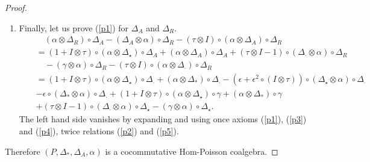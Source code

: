 \documentclass{article}
\theoremstyle{definition}
\theoremstyle{remark}
\numberwithin{equation}{section}
\begin{document}
\begin{proof}
\begin{enumerate}
\item
Finally, let us prove (\ref{p1}) for $\Delta_A$ and $\Delta_R$.
\begin{eqnarray}
 &&\quad(\alpha\otimes\Delta_R)\circ\Delta_A-(\Delta_A\otimes\alpha)\circ\Delta_R-(\tau\otimes I)\circ(\alpha\otimes\Delta_A)\circ\Delta_R\nonumber\\
&&=(1+I\otimes\tau)\circ(\alpha\otimes\Delta_\star)\circ\Delta_A+(\alpha\otimes\Delta_A)\circ\Delta_A+(\tau\otimes I-1)\circ(\Delta_\cdot\otimes\alpha)\circ\Delta_R\nonumber\\
&&\quad-(\gamma\otimes\alpha)\circ\Delta_R-(\tau\otimes I)\circ(\alpha\otimes\Delta_\cdot)\circ\Delta_R\nonumber\\
&&=(1+I\otimes\tau)\circ(\alpha\otimes\Delta_\star)\circ\Delta_\cdot+(\alpha\otimes\Delta_\ast)\circ\Delta_\cdot-(\epsilon+\epsilon^2\circ(I\otimes\tau))\circ(\Delta_\star\otimes\alpha)\circ\Delta_\cdot\nonumber\\
&&-\epsilon\circ(\Delta_\ast\otimes\alpha)\circ\Delta_\cdot+(1+I\otimes\tau)\circ(\alpha\otimes\Delta_\star)\circ\gamma+(\alpha\otimes\Delta_\ast)\circ\gamma\nonumber\\
&&+(\tau\otimes I-1)\circ(\Delta_\cdot\otimes\alpha)\circ\Delta_\star-(\gamma\otimes\alpha)\circ\Delta_\star\nonumber.
\end{eqnarray}
The left hand side vanishes by expanding and using once axioms (\ref{p1}), (\ref{p3}) and (\ref{p4}),
 twice  relations (\ref{p2}) and (\ref{p5}).
\end{enumerate}

Therefore $(P, \Delta_\ast, \Delta_A, \alpha)$ is a cocommutative Hom-Poisson coalgebra.
\end{proof}
\end{document}
